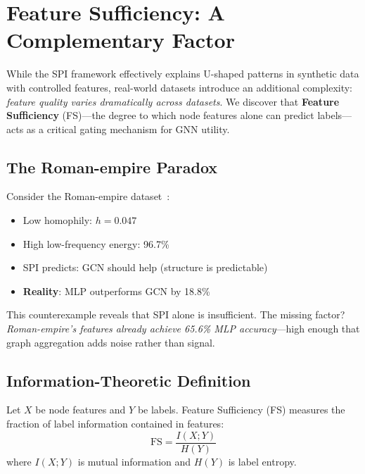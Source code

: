 
\section{Feature Sufficiency: A Complementary Factor}
\label{sec:feature_sufficiency}

While the SPI framework effectively explains U-shaped patterns in synthetic data with controlled features, real-world datasets introduce an additional complexity: \textit{feature quality varies dramatically across datasets}. We discover that \textbf{Feature Sufficiency} (FS)---the degree to which node features alone can predict labels---acts as a critical gating mechanism for GNN utility.

\subsection{The Roman-empire Paradox}

Consider the Roman-empire dataset~\cite{platonov2023heterophilous}:
\begin{itemize}
    \item Low homophily: $h = 0.047$
    \item High low-frequency energy: 96.7\%
    \item SPI predicts: GCN should help (structure is predictable)
    \item \textbf{Reality}: MLP outperforms GCN by 18.8\%
\end{itemize}

This counterexample reveals that SPI alone is insufficient. The missing factor? \textit{Roman-empire's features already achieve 65.6\% MLP accuracy}---high enough that graph aggregation adds noise rather than signal.

\subsection{Information-Theoretic Definition}

\begin{definition}
\label{def:fs}
Let $X$ be node features and $Y$ be labels. Feature Sufficiency (FS) measures the fraction of label information contained in features:
\begin{equation}
    \text{FS} = \frac{I(X; Y)}{H(Y)}
\end{equation}
where $I(X; Y)$ is mutual information and $H(Y)$ is label entropy.
\end{definition}


